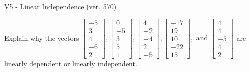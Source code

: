 \begin{exercise}
  \begin{exerciseTitle}V5 - Linear Independence (ver. 570)\end{exerciseTitle}
  \begin{exerciseStatement}
    Explain why the vectors \(\left[\begin{array}{r}
-5 \\
3 \\
4 \\
-6 \\
2
\end{array}\right] , \left[\begin{array}{r}
0 \\
-5 \\
3 \\
5 \\
1
\end{array}\right] , \left[\begin{array}{r}
4 \\
-2 \\
-4 \\
2 \\
-5
\end{array}\right] , \left[\begin{array}{r}
-17 \\
19 \\
10 \\
-22 \\
15
\end{array}\right] , \text{ and } \left[\begin{array}{r}
4 \\
4 \\
-5 \\
4 \\
2
\end{array}\right]\) are linearly dependent or linearly independent.	



\end{exerciseStatement}
\end{exercise}
